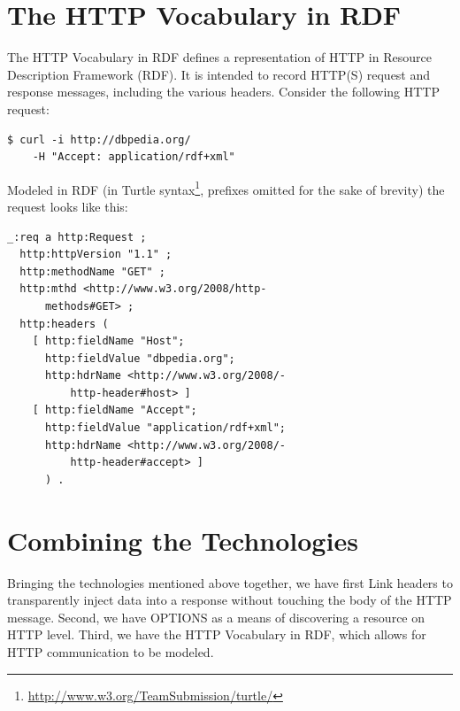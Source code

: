 \documentclass{acm_proc_article-sp}
\begin{document}
\section{The HTTP Vocabulary in RDF}\label{sec:httpvocab}
The HTTP Vocabulary in RDF\cite{HTTP:RDF} defines a representation of HTTP in Resource Description Framework (RDF)\cite{W3C:RDF}. It is intended to record HTTP(S) request and response messages, including the various headers. Consider the following HTTP request:
\begin{verbatim}
$ curl -i http://dbpedia.org/
    -H "Accept: application/rdf+xml"
\end{verbatim}
Modeled in RDF (in Turtle syntax\footnote{\url{http://www.w3.org/TeamSubmission/turtle/}}, prefixes omitted for the sake of brevity) the request looks like this:
\begin{verbatim}
_:req a http:Request ;
  http:httpVersion "1.1" ;
  http:methodName "GET" ;
  http:mthd <http://www.w3.org/2008/http-
      methods#GET> ;
  http:headers (
    [ http:fieldName "Host";
      http:fieldValue "dbpedia.org";
      http:hdrName <http://www.w3.org/2008/-
          http-header#host> ]
    [ http:fieldName "Accept";
      http:fieldValue "application/rdf+xml";
      http:hdrName <http://www.w3.org/2008/-
          http-header#accept> ]
      ) .
\end{verbatim}

\section{Combining the Technologies}\label{sec:implementation}
Bringing the technologies mentioned above together, we have first Link headers to transparently inject data into a response without touching the body of the HTTP message. Second, we have OPTIONS as a means of discovering a resource on HTTP level. Third, we have the HTTP Vocabulary in RDF, which allows for HTTP communication to be modeled.
\end{document}
